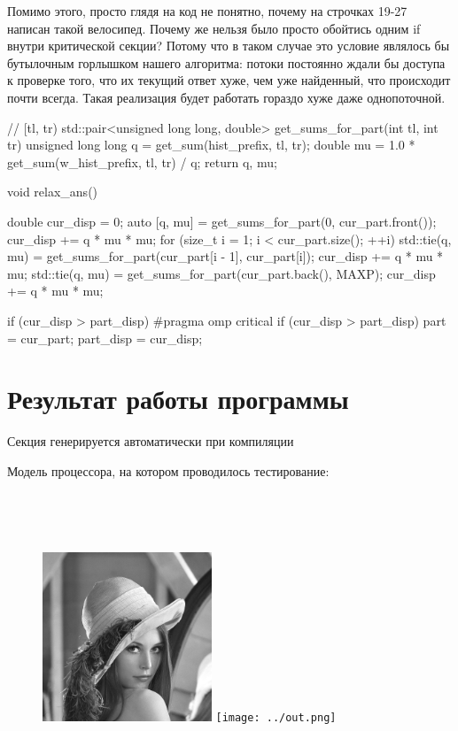 \documentclass[14pt, russian, onesize]{extreport}
\begin{document}
Помимо этого, просто глядя на код не понятно, почему на строчках 19-27
написан такой велосипед. Почему же нельзя было просто обойтись одним if 
внутри критической секции? Потому что в таком случае это условие являлось
бы бутылочным горлышком нашего алгоритма: потоки постоянно ждали бы доступа
к проверке того, что их текущий ответ хуже, чем уже найденный, что происходит
почти всегда. Такая реализация будет работать гораздо хуже даже однопоточной.
\begin{cppcode}
// [tl, tr)
std::pair<unsigned long long, double> get_sums_for_part(int tl, int tr) {
    unsigned long long q = get_sum(hist_prefix, tl, tr);
    double mu = 1.0 * get_sum(w_hist_prefix, tl, tr) / q;
    return {q, mu};
}

void relax_ans() {
    double cur_disp = 0;
    auto [q, mu] = get_sums_for_part(0, cur_part.front());
    cur_disp += q * mu * mu;
    for (size_t i = 1; i < cur_part.size(); ++i) {
        std::tie(q, mu) = get_sums_for_part(cur_part[i - 1], cur_part[i]);
        cur_disp += q * mu * mu;
    }
    std::tie(q, mu) = get_sums_for_part(cur_part.back(), MAXP);
    cur_disp += q * mu * mu;

    if (cur_disp > part_disp) {
#pragma omp critical
        {
            if (cur_disp > part_disp) {
                part = cur_part;
                part_disp = cur_disp;
            }
        }
    }
}
\end{cppcode}
\section*{Результат работы программы}
Секция генерируется автоматически при компиляции

Модель процессора, на котором проводилось тестирование:

\texttt{  }

\texttt{  }

\def\inputverbatim #1{\bgroup
  \def\do##1{\catcode`##1=12 }\dospecials
  \def\par{\endgraf\noindent\null}\obeylines\obeyspaces
  \tt \noindent
    
  \egroup
}


\begin{figure}[H]
    \centering
    \includegraphics[width=0.45\textwidth]{in.png}
    \quad
    \texttt{[image: ../out.png]}
\end{figure}
\end{document}
